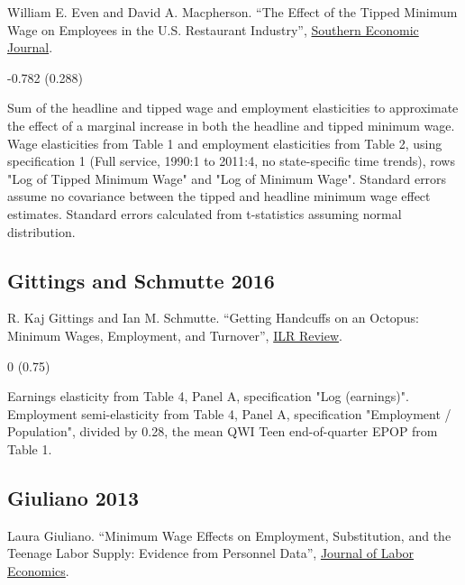\noindent William E. Even and David A. Macpherson. ``The Effect of the Tipped Minimum Wage on Employees in the U.S. Restaurant Industry'', \href{https://doi.org/10.4284/0038-4038-2012.283}{Southern Economic Journal}.

\vspace{0.7em}

 -0.782 (0.288)

\vspace{0.7em}

 Sum of the headline and tipped wage and employment elasticities to approximate the effect of a marginal increase in both the headline and tipped minimum wage. Wage elasticities from Table 1 and employment elasticities from Table 2, using specification 1 (Full service, 1990:1 to 2011:4, no state-specific time trends), rows "Log of Tipped Minimum Wage" and "Log of Minimum Wage". Standard errors assume no covariance between the tipped and headline minimum wage effect estimates. Standard errors calculated from t-statistics assuming normal distribution.

\subsection*{Gittings and Schmutte 2016}
\vspace{-0.7em}

\noindent R. Kaj Gittings and Ian M. Schmutte. ``Getting Handcuffs on an Octopus: Minimum Wages, Employment, and Turnover'', \href{https://doi.org/10.1177/0019793915623519}{ILR Review}.

\vspace{0.7em}

 0 (0.75)

\vspace{0.7em}

 Earnings elasticity from Table 4, Panel A, specification "Log (earnings)". Employment semi-elasticity from Table 4, Panel A, specification "Employment / Population", divided by 0.28, the mean QWI Teen end-of-quarter EPOP from Table 1.

\subsection*{Giuliano 2013}
\vspace{-0.7em}

\noindent Laura Giuliano. ``Minimum Wage Effects on Employment, Substitution, and the Teenage Labor Supply: Evidence from Personnel Data'', \href{https://doi.org/10.1086/666921}{Journal of Labor Economics}.


